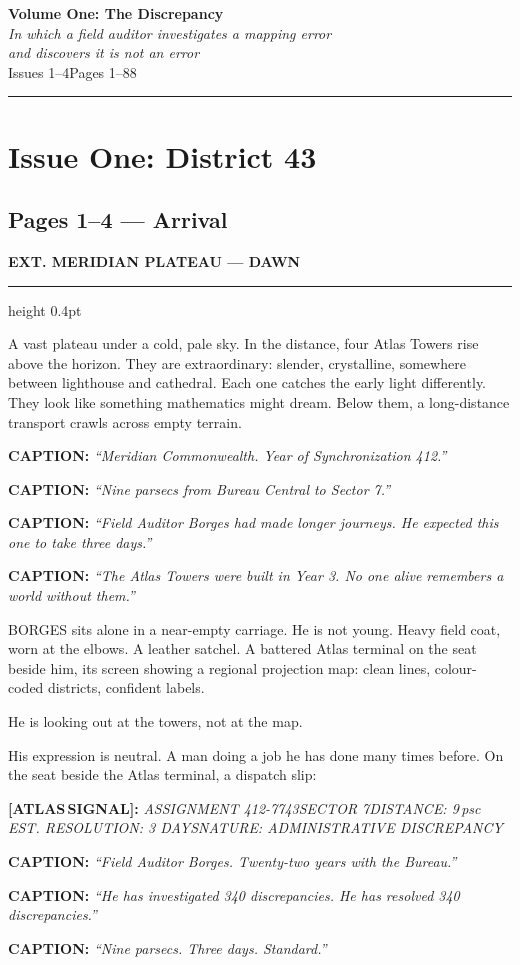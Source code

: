 \documentclass[11pt, letterpaper]{article}
\newcommand{\sceneheading}[1]{%
  \vspace{1.2em}
  {\large\bfseries\MakeUppercase{#1}}
  \vspace{0.3em}
  \hrule height 0.4pt
  \vspace{0.6em}
}
\newcounter{panelcount}
\newcommand{\panel}[2][]{%
  \stepcounter{panelcount}%
  \begin{mdframed}[style=panelstyle,
    frametitle={PANEL \thepanelcount%
      \ifx&#1&\else\ —\ #1\fi}]
  \small #2
  \end{mdframed}
}
\newcommand{\narrbox}[1]{%
  \smallskip
  \textbf{CAPTION:} \textit{``#1''}
  \smallskip
}
\newcommand{\atlassignal}[1]{%
  \smallskip
  {\color{atlasblue}\textbf{[ATLAS\,SIGNAL]:}} \textit{#1}
  \smallskip
}
\newcommand{\issuetitle}[3]{%
  \newpage
  \thispagestyle{empty}
  \vspace*{3cm}
  \begin{center}
    {\color{atlasblue}\Huge\bfseries #1}\\[0.8em]
    {\large\itshape #2}\\[2em]
    {\normalsize\color{notegray} #3}
  \end{center}
  \vspace{2cm}
  \hrule
  \newpage
  \setcounter{panelcount}{0}
}
\begin{document}
\newpage


\issuetitle
  {Volume One: The Discrepancy}
  {In which a field auditor investigates a mapping error\\
  and discovers it is not an error}
  {Issues 1–4\quad Pages 1–88}


\section*{Issue One: District 43}

\subsection*{Pages 1–4 — Arrival}

\sceneheading{Ext. Meridian Plateau — Dawn}

\panel[Wide establishing shot — double-page spread]{%
A vast plateau under a cold, pale sky. In the distance, four Atlas Towers rise
above the horizon. They are extraordinary: slender, crystalline, somewhere
between lighthouse and cathedral. Each one catches the early light differently.
They look like something mathematics might dream. Below them, a long-distance
transport crawls across empty terrain.

\narrbox{Meridian Commonwealth. Year of Synchronization 412.}
\narrbox{Nine parsecs from Bureau Central to Sector 7.}
\narrbox{Field Auditor Borges had made longer journeys. He expected this one
to take three days.}
\narrbox{The Atlas Towers were built in Year 3. No one alive remembers a world
without them.}
}

\panel[Interior of the transport — BORGES at the window]{%
BORGES sits alone in a near-empty carriage. He is not young. Heavy field coat,
worn at the elbows. A leather satchel. A battered Atlas terminal on the seat
beside him, its screen showing a regional projection map: clean lines,
colour-coded districts, confident labels.

He is looking out at the towers, not at the map.

His expression is neutral. A man doing a job he has done many times before.
On the seat beside the Atlas terminal, a dispatch slip:

\atlassignal{ASSIGNMENT 412-7743\quad SECTOR 7\quad DISTANCE: 9\,psc\quad
EST. RESOLUTION: 3 DAYS\quad NATURE: ADMINISTRATIVE DISCREPANCY}

\narrbox{Field Auditor Borges. Twenty-two years with the Bureau.}
\narrbox{He has investigated 340 discrepancies. He has resolved 340
discrepancies.}
\narrbox{Nine parsecs. Three days. Standard.}
}
\end{document}
